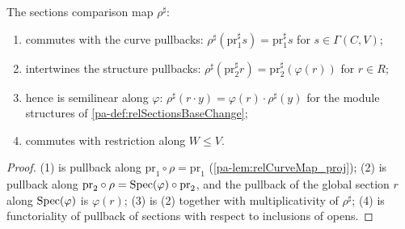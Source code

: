 \begin{lemma}
  \label{pa-lem:relSectionsMap_props}
  \leanok

  The sections comparison map \(\rho^{\sharp}\):
  \begin{enumerate}
    \item commutes with the curve pullbacks:
      \(\rho^{\sharp}(\mathrm{pr}_1^{\sharp} s) = \mathrm{pr}_1^{\sharp} s\) for
      \(s \in \Gamma(C, V)\);
    \item intertwines the structure pullbacks:
      \(\rho^{\sharp}(\mathrm{pr}_2^{\sharp} r) = \mathrm{pr}_2^{\sharp}(\varphi(r))\)
      for \(r \in R\);
    \item hence is semilinear along \(\varphi\):
      \(\rho^{\sharp}(r \cdot y) = \varphi(r) \cdot \rho^{\sharp}(y)\) for the module
      structures of \ref{pa-def:relSectionsBaseChange};
    \item commutes with restriction along \(W \le V\).
  \end{enumerate}
\end{lemma}
\begin{proof}
  \leanok
  (1) is pullback along \(\mathrm{pr}_1 \circ \rho = \mathrm{pr}_1\)
  (\ref{pa-lem:relCurveMap_proj}); (2) is pullback along
  \(\mathrm{pr}_2 \circ \rho = \operatorname{Spec}(\varphi) \circ \mathrm{pr}_2\), and the pullback of
  the global section \(r\) along \(\operatorname{Spec}(\varphi)\) is \(\varphi(r)\); (3) is (2)
  together with multiplicativity of \(\rho^{\sharp}\); (4) is functoriality of pullback
  of sections with respect to inclusions of opens.
\end{proof}

